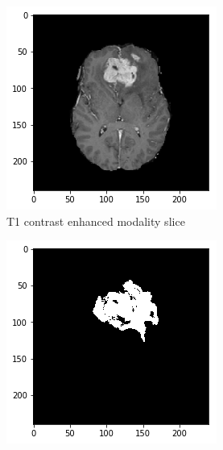 \begin{figure}[H]
    \centering
    \begin{subfigure}[t]{.4\textwidth}
        \centering
        \includegraphics[width=\linewidth]{chapters/06_hdm/c_Brats18_2013_17_1_L1/46.png}
        \caption{T1 contrast enhanced modality slice}
    \end{subfigure}\hspace{1cm}%
    \begin{subfigure}[t]{.4\textwidth}
        \centering
        \includegraphics[width=\linewidth]{chapters/06_hdm/c_Brats18_2013_17_1_L1/45.png}

\end{subfigure}
\end{figure}
